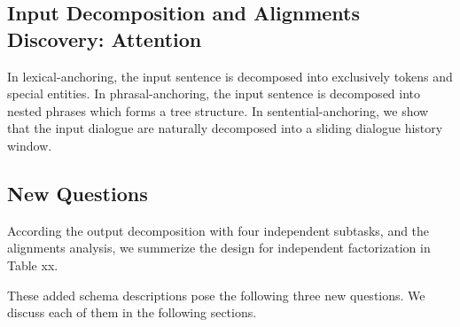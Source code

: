 \subsection{Input Decomposition and Alignments Discovery: Attention}
\label{sec:sgd:decompose-x}

In lexical-anchoring, the input sentence is decomposed into
exclusively tokens and special entities. In phrasal-anchoring, the
input sentence is decomposed into nested phrases which forms a tree
structure. In sentential-anchoring, we show that the input dialogue
are naturally decomposed into a sliding dialogue history window.

\subsection{New Questions}
\label{ssec:sgd:new-questions}
According the output decomposition with four independent subtasks, and
the alignments analysis, we summerize the design for independent
factorization in Table xx.

These added schema descriptions pose the following three new
questions. We discuss each of them in the following sections.
\\
\setlength{\fboxsep}{1.5pt} 


